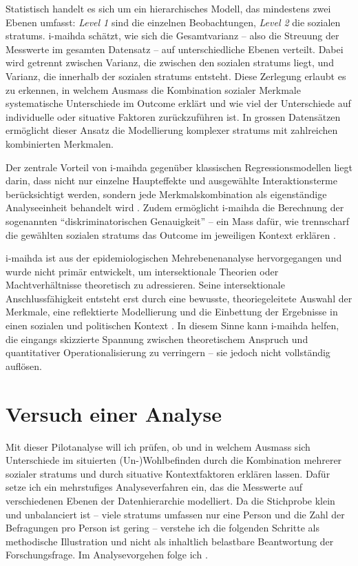 Statistisch handelt es sich um ein hierarchisches Modell, das mindestens zwei Ebenen umfasst: \textit{Level 1} sind die einzelnen Beobachtungen, \textit{Level 2} die sozialen \glspl{stratum}. \gls{i-maihda} schätzt, wie sich die Gesamtvarianz -- also die Streuung der Messwerte im gesamten Datensatz -- auf unterschiedliche Ebenen verteilt. Dabei wird getrennt zwischen Varianz, die zwischen den sozialen \glspl{stratum} liegt, und Varianz, die innerhalb der sozialen \glspl{stratum} entsteht. Diese Zerlegung erlaubt es zu erkennen, in welchem Ausmass die Kombination sozialer Merkmale systematische Unterschiede im Outcome erklärt und wie viel der Unterschiede auf individuelle oder situative Faktoren zurückzuführen ist. In grossen Datensätzen ermöglicht dieser Ansatz die Modellierung komplexer \glspl{stratum} mit zahlreichen kombinierten Merkmalen.

Der zentrale Vorteil von \gls{i-maihda} gegenüber klassischen Regressionsmodellen liegt darin, dass nicht nur einzelne Haupteffekte und ausgewählte Interaktionsterme berücksichtigt werden, sondern jede Merkmalskombination als eigenständige Analyseeinheit behandelt wird \parencite{scottIntersectionalityQuantitativeMethods2017,bowlegInvitedReflectionQuantifying2016}. Zudem ermöglicht \gls{i-maihda} die Berechnung der sogenannten \enquote{diskriminatorischen Genauigkeit} -- ein Mass dafür, wie trennscharf die gewählten sozialen \glspl{stratum} das Outcome im jeweiligen Kontext erklären \parencite{evansTutorialConductingIntersectional2024}.

\gls{i-maihda} ist aus der epidemiologischen Mehrebenenanalyse hervorgegangen und wurde nicht primär entwickelt, um intersektionale Theorien oder Machtverhältnisse theoretisch zu adressieren. Seine intersektionale Anschlussfähigkeit entsteht erst durch eine bewusste, theoriegeleitete Auswahl der Merkmale, eine reflektierte Modellierung und die Einbettung der Ergebnisse in einen sozialen und politischen Kontext \parencite{grossModellingIntersectionalityQuantitative2023}. In diesem Sinne kann \gls{i-maihda} helfen, die eingangs skizzierte Spannung zwischen theoretischem Anspruch und quantitativer Operationalisierung zu verringern -- sie jedoch nicht vollständig auflösen.

\section{Versuch einer Analyse}

Mit dieser Pilotanalyse will ich prüfen, ob und in welchem Ausmass sich Unterschiede im situierten (Un\nobreakdash-)Wohlbefinden durch die Kombination mehrerer sozialer \glspl{stratum} und durch situative Kontextfaktoren erklären lassen. Dafür setze ich ein mehrstufiges Analyseverfahren ein, das die Messwerte auf verschiedenen Ebenen der Datenhierarchie modelliert. Da die Stichprobe klein und unbalanciert ist -- viele \glspl{stratum} umfassen nur eine Person und die Zahl der Befragungen pro Person ist gering -- verstehe ich die folgenden Schritte als methodische Illustration und nicht als inhaltlich belastbare Beantwortung der Forschungsfrage. Im Analysevorgehen folge ich \textcite{evansTutorialConductingIntersectional2024}.

